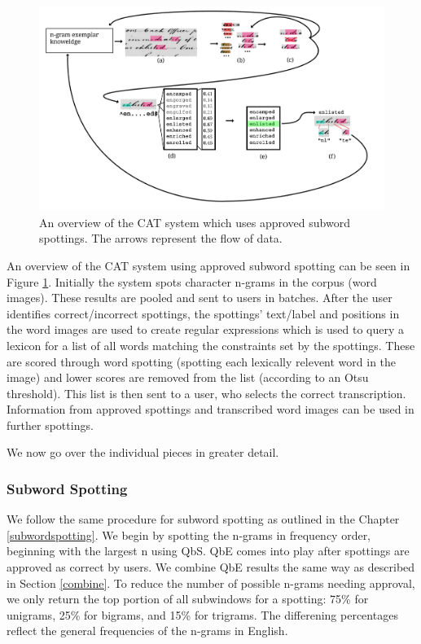 \documentclass[ms,electronic,twosidetoc,letterpaper,chaptercenter,parttop,lol,lof,lot]{byumsphd}
\begin{document}
\begin{figure}
    \centering
    \includegraphics[width=.9\textwidth]{flow6}
    \caption{An overview of the CAT system which uses approved subword spottings. The arrows represent the flow of data.}
    \label{fig:flow}
\end{figure}
An overview of the CAT system using approved subword spotting can be seen in Figure \ref{fig:flow}. Initially the system spots character n-grams in the corpus (word images). These results are pooled and sent to users in batches. After the user identifies correct/incorrect spottings, the spottings' text/label and positions in the word images are used to create regular expressions which is used to query a lexicon for a list of all words matching the constraints set by the spottings. These are scored through word spotting (spotting each lexically relevent word in the image) and lower scores are removed from the list (according to an Otsu threshold). This list is then sent to a user, who selects the correct transcription. Information from approved spottings and transcribed word images can be used in further spottings.

We now go over the individual pieces in greater detail.

\subsubsection{Subword Spotting}
We follow the same procedure for subword spotting as outlined in the Chapter \ref{subwordspotting}. We begin by spotting the n-grams in frequency order, beginning with the largest n using QbS. QbE comes into play after spottings are approved as correct by users. We combine QbE results the same way as described in Section \ref{combine}.
To reduce the number of possible n-grams needing approval, we only return the top portion of all subwindows for a spotting: 75\% for unigrams, 25\% for bigrams, and 15\% for trigrams. The differening percentages reflect the general frequencies of the n-grams in English.
\end{document}
